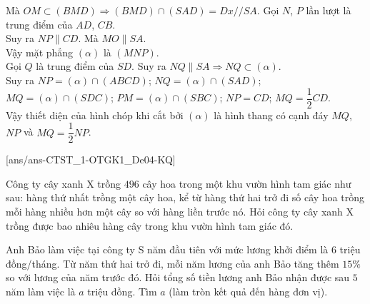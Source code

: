 \begin{ex}
{\begin{itemchoice}
			Mà $ OM \subset (BMD) \Rightarrow (BMD)\cap(SAD)=Dx//SA$.
			\itemch Gọi $N$, $P$ lần lượt là trung điểm của $AD$, $CB$.\\
			Suy ra $NP \parallel CD$. Mà $MO \parallel SA$.\\
			Vậy mặt phẳng $(\alpha)$ là $(MNP)$.\\
			Gọi $Q$ là trung điểm của $SD$. Suy ra $NQ \parallel SA \Rightarrow NQ \subset (\alpha)$.\\
			Suy ra $NP=(\alpha)\cap (ABCD)$; $NQ=(\alpha)\cap (SAD)$; $MQ=(\alpha)\cap(SDC)$; $PM=(\alpha)\cap(SBC)$; $NP=CD$; $ MQ=\dfrac{1}{2}CD $.\\
			Vậy thiết diện của hình chóp khi cắt bởi $(\alpha)$ là hình thang có cạnh đáy $MQ$, $NP$ và $MQ=\dfrac{1}{2}NP$.
		\end{itemchoice}
	}
\end{ex}
[ans/ans-CTST_1-OTGK1_De04-KQ]
\caukq
\begin{ex}%
	Công ty cây xanh X trồng $ 496 $ cây hoa trong một khu vườn hình tam giác như sau: hàng thứ nhất trồng một cây hoa, kể từ hàng thứ hai trở đi số cây hoa trồng mỗi hàng nhiều hơn một cây so với hàng liền trước nó. Hỏi công ty cây xanh X trồng được bao nhiêu hàng cây trong khu vườn hình tam giác đó.
\end{ex}
\begin{ex}%
	Anh Bảo làm việc tại công ty S năm đầu tiên với mức lương khởi điểm là $6$ triệu đồng/tháng. Từ năm thứ hai trở đi, mỗi năm lương của anh Bảo tăng thêm $15\%$ so với lương của năm trước đó. Hỏi tổng số tiền lương anh Bảo nhận được sau $5$ năm làm việc là $a$ triệu đồng. Tìm $a$ (làm tròn kết quả đến hàng đơn vị).
\end{ex}
